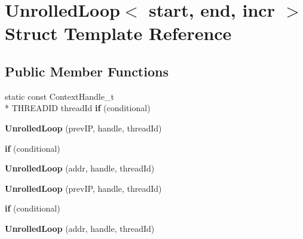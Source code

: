 \hypertarget{structUnrolledLoop}{\section{Unrolled\-Loop$<$ start, end, incr $>$ Struct Template Reference}
\label{structUnrolledLoop}
}
\subsection*{Public Member Functions}
\begin{DoxyCompactItemize}
\item 
\hypertarget{structUnrolledLoop_ae53a96d3aa8c39094c1d0af38f5b284f}{static const Context\-Handle\-\_\-t \\*
T\-H\-R\-E\-A\-D\-I\-D thread\-Id {\bfseries if} (conditional)}\label{structUnrolledLoop_ae53a96d3aa8c39094c1d0af38f5b284f}

\item 
\hypertarget{structUnrolledLoop_aca80840834e613c17d74b4474f82a932}{{\bfseries Unrolled\-Loop} (prev\-I\-P, handle, thread\-Id)}\label{structUnrolledLoop_aca80840834e613c17d74b4474f82a932}

\item 
\hypertarget{structUnrolledLoop_a5298f486afcc2fcdaf4f7317f8aa7084}{{\bfseries if} (conditional)}\label{structUnrolledLoop_a5298f486afcc2fcdaf4f7317f8aa7084}

\item 
\hypertarget{structUnrolledLoop_a85193a1ce4896539818cb399f71ef10f}{{\bfseries Unrolled\-Loop} (addr, handle, thread\-Id)}\label{structUnrolledLoop_a85193a1ce4896539818cb399f71ef10f}

\item 
\hypertarget{structUnrolledLoop_aca80840834e613c17d74b4474f82a932}{{\bfseries Unrolled\-Loop} (prev\-I\-P, handle, thread\-Id)}\label{structUnrolledLoop_aca80840834e613c17d74b4474f82a932}

\item 
\hypertarget{structUnrolledLoop_a5298f486afcc2fcdaf4f7317f8aa7084}{{\bfseries if} (conditional)}\label{structUnrolledLoop_a5298f486afcc2fcdaf4f7317f8aa7084}

\item 
\hypertarget{structUnrolledLoop_a85193a1ce4896539818cb399f71ef10f}{{\bfseries Unrolled\-Loop} (addr, handle, thread\-Id)}\label{structUnrolledLoop_a85193a1ce4896539818cb399f71ef10f}

\end{DoxyCompactItemize}
